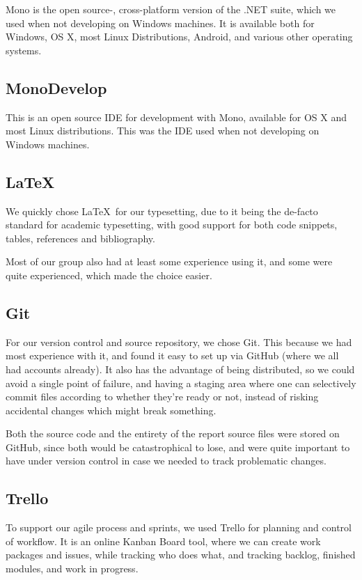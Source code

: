 Mono is the open source-, cross-platform version of the .NET suite, which we used when not developing on Windows machines. It is available both for Windows, OS X, most Linux Distributions, Android, and various other operating systems.

\subsection{MonoDevelop}
This is an open source IDE for development with Mono, available for OS X and most Linux distributions. This was the IDE used when not developing on Windows machines.

\subsection{\LaTeX}
We quickly chose \LaTeX \ for our typesetting, due to it being the de-facto standard for academic typesetting, with good support for both code snippets, tables, references and bibliography.

Most of our group also had at least some experience using it, and some were quite experienced, which made the choice easier.

\subsection{Git}
For our version control and source repository, we chose Git. This because we had most experience with it, and found it easy to set up via GitHub (where we all had accounts already). It also has the advantage of being distributed, so we could avoid a single point of failure, and having a staging area where one can selectively commit files according to whether they're ready or not, instead of risking accidental changes which might break something.

Both the source code and the entirety of the report source files were stored on GitHub, since both would be catastrophical to lose, and were quite important to have under version control in case we needed to track problematic changes.

\subsection{Trello}
To support our agile process and sprints, we used Trello for planning and control of workflow. It is an online Kanban Board tool, where we can create work packages and issues, while tracking who does what, and tracking backlog, finished modules, and work in progress.

